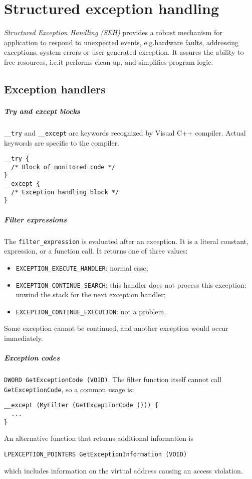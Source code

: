 \chapter{Structured exception handling}
\emph{Structured Exception Handling (SEH)} provides a robust mechanism for application to respond to unexpected events, e.g.\@ hardware faults, addressing exceptions, system errors or user generated exception. It assures the ability to free resources, i.e.\@ it performs clean-up, and simplifies program logic.

\section{Exception handlers}
\paragraph{Try and except blocks}
\texttt{\_\_try} and \texttt{\_\_except} are keywords recognized by Visual C++ compiler. Actual keywords are specific to the compiler.

\begin{verbatim}
__try {
  /* Block of monitored code */
}
__except {
  /* Exception handling block */
}
\end{verbatim}

\paragraph{Filter expressions}
The \texttt{filter\_expression} is evaluated after an exception. It is a literal constant, expression, or a function call. It returns one of three values:
\begin{itemize}
\item \texttt{EXCEPTION\_EXECUTE\_HANDLER}: normal case;
\item \texttt{EXCEPTION\_CONTINUE\_SEARCH}: this handler does not process this exception; unwind the stack for the next exception handler;
\item \texttt{EXCEPTION\_CONTINUE\_EXECUTION}: not a problem.
\end{itemize}
Some exception cannot be continued, and another exception would occur immediately.

\paragraph{Exception codes} \texttt{DWORD GetExceptionCode (VOID)}. The filter function itself cannot call \texttt{GetExceptionCode}, so a common usage is:
\begin{verbatim}
__except (MyFilter (GetExceptionCode ())) {
  ...
}
\end{verbatim}
An alternative function that returns additional information is
\begin{verbatim}
LPEXCEPTION_POINTERS GetExceptionInformation (VOID)
\end{verbatim}
which includes information on the virtual address causing an access violation.


